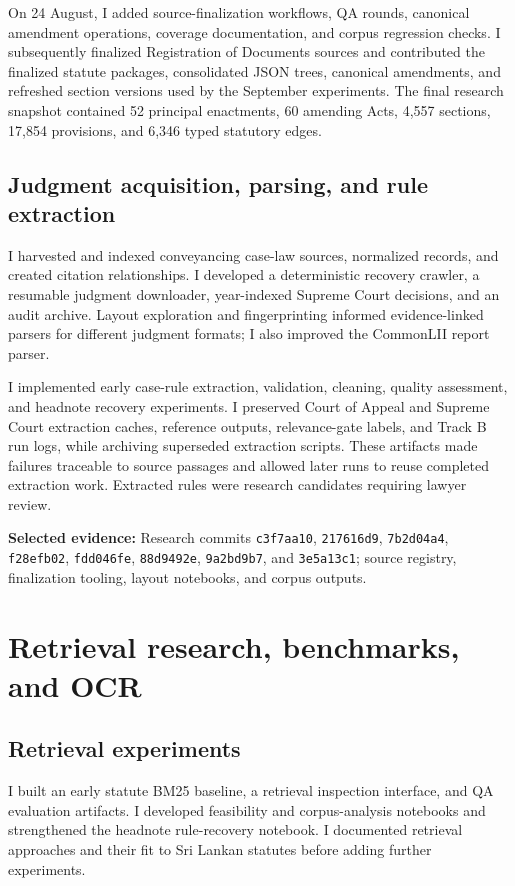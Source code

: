 \documentclass[11pt,a4paper]{article}
\newcommand{\evidence}[1]{\par{\small\textbf{Selected evidence:} #1}\par}
\newcommand{\repo}[1]{\texttt{\nolinkurl{#1}}}
\begin{document}
On 24 August, I added source-finalization workflows, QA rounds, canonical amendment operations, coverage documentation, and corpus regression checks. I subsequently finalized Registration of Documents sources and contributed the finalized statute packages, consolidated JSON trees, canonical amendments, and refreshed section versions used by the September experiments. The final research snapshot contained 52 principal enactments, 60 amending Acts, 4,557 sections, 17,854 provisions, and 6,346 typed statutory edges.

\subsection{Judgment acquisition, parsing, and rule extraction}
I harvested and indexed conveyancing case-law sources, normalized records, and created citation relationships. I developed a deterministic recovery crawler, a resumable judgment downloader, year-indexed Supreme Court decisions, and an audit archive. Layout exploration and fingerprinting informed evidence-linked parsers for different judgment formats; I also improved the CommonLII report parser.

I implemented early case-rule extraction, validation, cleaning, quality assessment, and headnote recovery experiments. I preserved Court of Appeal and Supreme Court extraction caches, reference outputs, relevance-gate labels, and Track B run logs, while archiving superseded extraction scripts. These artifacts made failures traceable to source passages and allowed later runs to reuse completed extraction work. Extracted rules were research candidates requiring lawyer review.

\evidence{Research commits \repo{c3f7aa10}, \repo{217616d9}, \repo{7b2d04a4}, \repo{f28efb02}, \repo{fdd046fe}, \repo{88d9492e}, \repo{9a2bd9b7}, and \repo{3e5a13c1}; source registry, finalization tooling, layout notebooks, and corpus outputs.}

\newpage
\section{Retrieval research, benchmarks, and OCR}
\subsection{Retrieval experiments}
I built an early statute BM25 baseline, a retrieval inspection interface, and QA evaluation artifacts. I developed feasibility and corpus-analysis notebooks and strengthened the headnote rule-recovery notebook. I documented retrieval approaches and their fit to Sri Lankan statutes before adding further experiments.
\end{document}
